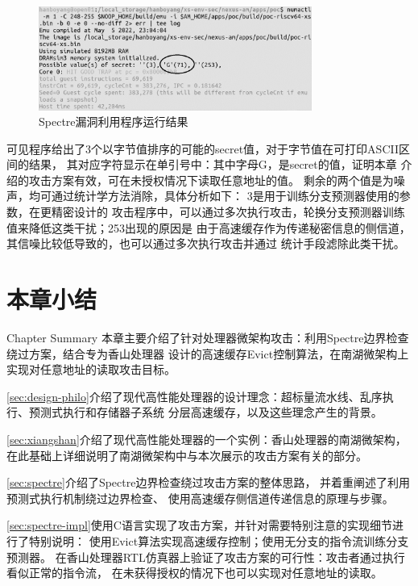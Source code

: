 \begin{figure}[ht]
	\centering
	\includegraphics[width=0.8\textwidth]{figs/spectre-result.png}
	\caption{Spectre漏洞利用程序运行结果}
	\label{fig:spectre-result}
\end{figure}

可见程序给出了3个以字节值排序的可能的secret值，对于字节值在可打印ASCII区间的结果，
其对应字符显示在单引号中：其中字母G，是secret的值，证明本章
介绍的攻击方案有效，可在未授权情况下读取任意地址的值。
剩余的两个值是为噪声，均可通过统计学方法消除，具体分析如下：
3是用于训练分支预测器使用的参数，在更精密设计的
攻击程序中，可以通过多次执行攻击，轮换分支预测器训练值来降低这类干扰；253出现的原因是
由于高速缓存作为传递秘密信息的侧信道，其信噪比较低导致的，也可以通过多次执行攻击并通过
统计手段滤除此类干扰。


\section{本章小结}{Chapter Summary}
本章主要介绍了针对处理器微架构攻击：利用Spectre边界检查绕过方案，结合专为香山处理器
设计的高速缓存Evict控制算法，在南湖微架构上实现对任意地址的读取攻击目标。

\ref{sec:design-philo}介绍了现代高性能处理器的设计理念：超标量流水线、乱序执行、预测式执行和存储器子系统
分层高速缓存，以及这些理念产生的背景。

\ref{sec:xiangshan}介绍了现代高性能处理器的一个实例：香山处理器的南湖微架构，
在此基础上详细说明了南湖微架构中与本次展示的攻击方案有关的部分。

\ref{sec:spectre}介绍了Spectre边界检查绕过攻击方案的整体思路，
并着重阐述了利用预测式执行机制绕过边界检查、
使用高速缓存侧信道传递信息的原理与步骤。

\ref{sec:spectre-impl}使用C语言实现了攻击方案，并针对需要特别注意的实现细节进行了特别说明：
使用Evict算法实现高速缓存控制；使用无分支的指令流训练分支预测器。
在香山处理器RTL仿真器上验证了攻击方案的可行性：攻击者通过执行看似正常的指令流，
在未获得授权的情况下也可以实现对任意地址的读取。


\newpage
